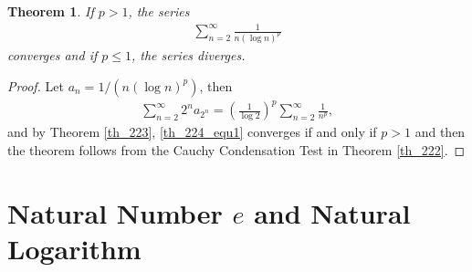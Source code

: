 \documentclass[11pt]{book}
\newtheorem{theorem}{Theorem}[chapter]
\theoremstyle{definition}
\numberwithin{equation}{chapter}
\begin{document}
\medskip

\begin{theorem}
If $p > 1$, the series
\begin{align*}
    \sum^\infty_{n=2} \frac{1}{n \left(\log n\right)^p} 
\end{align*}
converges and if $p \leq 1$, the series diverges.
\end{theorem}
\begin{proof}
Let $a_n = 1/\left(n \left(\log n\right)^p\right)$, then
\begin{align}\label{th_224_equ1}
    \sum^\infty_{n=2} 2^n a_{2^n} = \left(\frac{1}{\log 2}\right)^p \sum^\infty_{n=2} \frac{1}{n^p},
\end{align}
and by Theorem \ref{th_223}, \eqref{th_224_equ1} converges if and only if $p > 1$ and then the theorem follows from the Cauchy Condensation Test in Theorem \ref{th_222}.
\end{proof}

\medskip



\section{Natural Number $e$ and Natural Logarithm}
\end{document}
